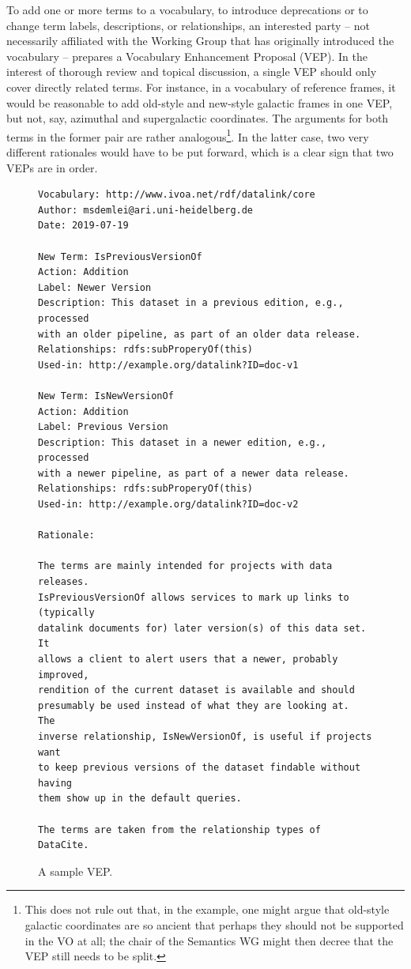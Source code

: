 \documentclass[11pt,a4paper]{ivoa}
\begin{document}
To add one or more terms to a vocabulary, to introduce deprecations or
to change term labels, descriptions, or relationships,
an interested party -- not necessarily affiliated with the Working Group
that has originally introduced the vocabulary -- prepares a Vocabulary
Enhancement Proposal (VEP).  In the interest of thorough review and
topical discussion, a single VEP should only cover directly related
terms.  For instance, in a vocabulary of reference frames, it would be
reasonable to add old-style and new-style galactic frames in one
VEP, but not, say, azimuthal and supergalactic coordinates.  The
arguments for both terms in the former pair are rather
analogous\footnote{This does not rule out that, in the example, one
might argue that old-style galactic coordinates are so ancient that
perhaps they should not be supported in the VO at all; the chair of the
Semantics WG might then decree that the VEP still needs to be split.}.
In the latter case, two very different rationales would have
to be put forward, which is a clear sign that two VEPs are in order.

\begin{figure}
\begin{verbatim}
Vocabulary: http://www.ivoa.net/rdf/datalink/core
Author: msdemlei@ari.uni-heidelberg.de
Date: 2019-07-19

New Term: IsPreviousVersionOf
Action: Addition
Label: Newer Version
Description: This dataset in a previous edition, e.g., processed 
with an older pipeline, as part of an older data release.
Relationships: rdfs:subProperyOf(this)
Used-in: http://example.org/datalink?ID=doc-v1

New Term: IsNewVersionOf
Action: Addition
Label: Previous Version
Description: This dataset in a newer edition, e.g., processed
with a newer pipeline, as part of a newer data release.
Relationships: rdfs:subProperyOf(this)
Used-in: http://example.org/datalink?ID=doc-v2

Rationale: 

The terms are mainly intended for projects with data releases.
IsPreviousVersionOf allows services to mark up links to (typically
datalink documents for) later version(s) of this data set.  It
allows a client to alert users that a newer, probably improved,
rendition of the current dataset is available and should
presumably be used instead of what they are looking at.  The
inverse relationship, IsNewVersionOf, is useful if projects want
to keep previous versions of the dataset findable without having
them show up in the default queries. 

The terms are taken from the relationship types of DataCite.
\end{verbatim}

\caption{A sample VEP.}
\label{fig:vepsample}
\end{figure}
\end{document}
